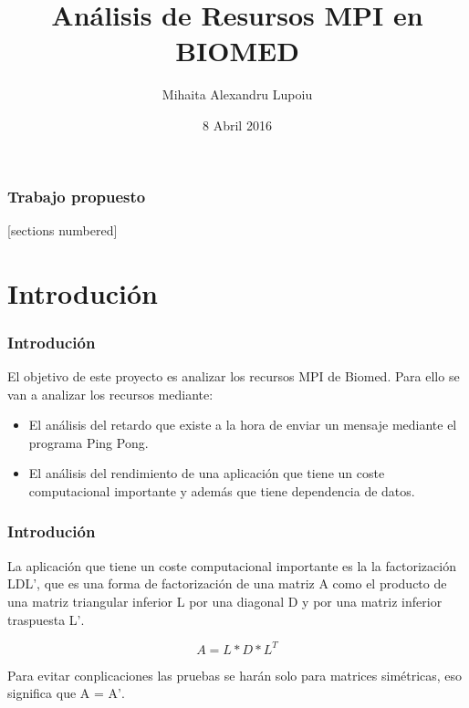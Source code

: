 \documentclass[10pt]{beamer}
\title{Análisis de Resursos MPI en BIOMED}
\date{8 Abril 2016}
\author{Mihaita Alexandru Lupoiu}
\institute{Modelos de Programación en Grid (Mpg)}
\begin{document}
\maketitle
\begin{frame}
  \frametitle{Trabajo propuesto}
  [sections numbered]
  \tableofcontents[hideallsubsections]
\end{frame}
\section{Introdución}
\begin{frame}[fragile]
  \frametitle{Introdución}
  
  El objetivo de este proyecto es analizar los recursos MPI de Biomed. Para ello se van a analizar los recursos mediante:
  
\begin{itemize}
\item El análisis del retardo que existe a la hora de enviar un mensaje mediante el programa Ping Pong.
\item El análisis del rendimiento de una aplicación que tiene un coste computacional importante y además que tiene dependencia de datos.
\end{itemize}
  
\end{frame}
\begin{frame}[fragile]
\frametitle{Introdución}

La aplicación que tiene un coste computacional importante es la la factorización \textsc{LDL'}, que es una forma de factorización de una matriz \textsc{A} como el producto de una matriz triangular inferior \textsc{L} por una diagonal \textsc{D} y por una matriz inferior traspuesta \textsc{L'}.

  \begin{equation*}
    A = L*D*L^T
  \end{equation*}

  Para evitar conplicaciones las pruebas se harán solo para matrices simétricas, eso significa que \textsc{A = A'}.
\end{frame}
\end{document}

